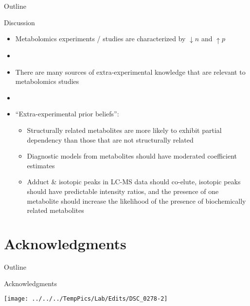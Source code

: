 \documentclass[xcolor=dvipsnames]{beamer}
\begin{document}
\begin{frame}{Outline}
	\vspace{-10.5pt}
	\tableofcontents[currentsection,subsectionstyle=hide]
\end{frame}

\begin{frame}{Discussion}
	\vspace{-10.5pt}
	\begin{itemize}
		\item Metabolomics experiments / studies are characterized by $\downarrow n$ and $\uparrow p$ \pause
		\item[]
		\item There are many sources of extra-experimental knowledge that are relevant to metabolomics studies \pause
		\item[] 
		\item ``Extra-experimental prior beliefs'': \pause
		\begin{itemize}
			\item Structurally related metabolites are more likely to exhibit partial dependency than those that are not structurally related \pause
			\item Diagnostic models from metabolites should have moderated coefficient estimates \pause
			\item Adduct \& isotopic peaks in LC-MS data should co-elute, isotopic peaks should have predictable intensity ratios, and the presence of one metabolite should increase the likelihood of the presence of biochemically related metabolites
		\end{itemize}
	\end{itemize}
\end{frame}

\section{Acknowledgments}
\begin{frame}{Outline}
	\vspace{-10.5pt}
	\tableofcontents[currentsection,subsectionstyle=hide]
\end{frame}

\begin{frame}{Acknowledgments}
	\vspace{-5.5pt}
	\begin{center}
		\texttt{[image: ../../../TempPics/Lab/Edits/DSC\_0278-2]}
	\end{center}
\end{frame}
\end{document}
